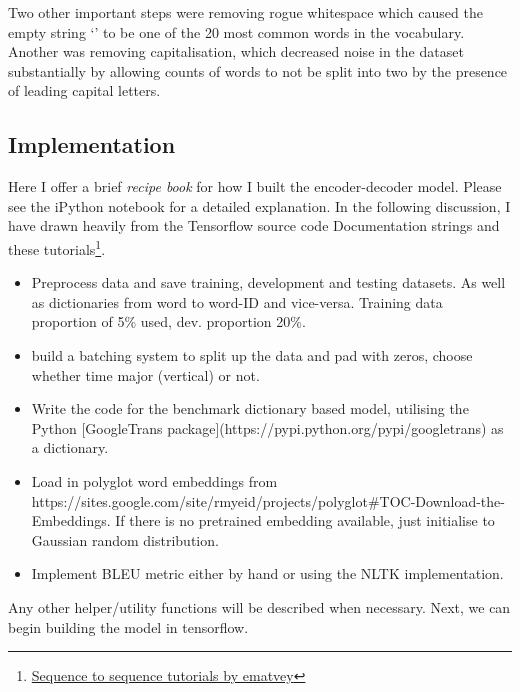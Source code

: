 \documentclass[]{article}
\begin{document}
Two other important steps were removing rogue whitespace which caused the empty string `' to be one of the 20 most common words in the vocabulary. Another was removing capitalisation, which decreased noise in the dataset substantially by allowing counts of words to not be split into two by the presence of leading capital letters.

\subsection{Implementation}
Here I offer a brief \textit{recipe book} for how I built the encoder-decoder model. Please see the iPython notebook for a detailed explanation. In the following discussion, I have drawn heavily from the Tensorflow source code Documentation strings and these tutorials\footnote{ \href{https://github.com/ematvey/tensorflow-seq2seq-tutorials}{Sequence to sequence tutorials by ematvey}}.
\begin{itemize}
	\item Preprocess data and save training, development and testing datasets. As well as dictionaries from word to word-ID and vice-versa. Training data proportion of 5\% used, dev. proportion 20\%.
	\item build a batching system to split up the data and pad with zeros, choose whether time major (vertical) or not.
	\item Write the code for the benchmark dictionary based model, utilising the Python [GoogleTrans package](https://pypi.python.org/pypi/googletrans) as a dictionary.
	\item Load in polyglot word embeddings from https://sites.google.com/site/rmyeid/projects/polyglot\#TOC-Download-the-Embeddings. If there is no pretrained embedding available, just initialise to Gaussian random distribution. 
	\item Implement BLEU metric either by hand or using the NLTK implementation.
\end{itemize}
Any other helper/utility functions will be described when necessary. Next, we can begin building the model in tensorflow.
\end{document}
